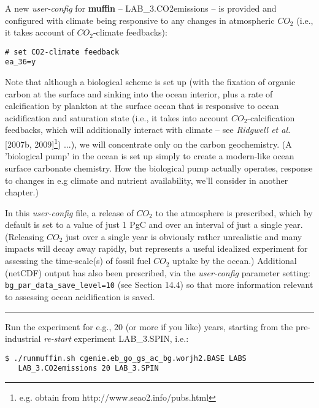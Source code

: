 \documentclass[11pt,fleqn]{book} %
\begin{document}
A new \textit{user-config} for \textbf{muffin} -- \footnotesize\textsf{LAB\_3.CO2emissions }\normalsize -- is provided and configured with climate being responsive to any changes in atmospheric \(CO_{2}\) (i.e., it takes account of \(CO_{2}\)-climate feedbacks):
\vspace{-2pt}\begin{verbatim}
# set CO2-climate feedback
ea_36=y
\end{verbatim}\vspace{-2pt}
\noindent Note that although a biological scheme is set up (with the fixation of organic carbon at the surface and sinking into the ocean interior, plus a rate of calcification by plankton at the surface ocean that is responsive to ocean acidification and saturation state (i.e., it takes into account \(CO_{2}\)-calcification feedbacks, which will additionally interact with climate – see \textit{Ridgwell et al.} [2007b, 2009]\footnote{e.g. obtain from http://www.seao2.info/pubs.html}) ...), we will concentrate only on the carbon geochemistry. (A 'biological pump' in the ocean is set up simply to create a modern-like ocean surface carbonate chemistry. How the biological pump actually operates, response to changes in e.g climate and nutrient availability, we'll consider in another chapter.)

In this \textit{user-config} file, a release of \(CO_{2}\) to the atmosphere is prescribed, which by default is set to a value of just 1 PgC and over an interval of just a single year. (Releasing \(CO_{2}\) just over a single year is obviously rather unrealistic and many impacts will decay away rapidly, but represents a useful idealized experiment for assessing the time-scale(s) of fossil fuel \(CO_{2}\) uptake by the ocean.) Additional (netCDF) output has also been prescribed, via the \textit{user-config} parameter setting: \texttt{bg\_par\_data\_save\_level=10} (see Section 14.4) so that more information relevant to assessing ocean acidification is saved.

\vspace{1mm}
\noindent\rule{4cm}{0.1mm}
\vspace{2mm}

\noindent Run the experiment for e.g., 20 (or more if you like) years, starting from the pre-industrial \textit{re-start} experiment \textsf{\footnotesize LAB\_3.SPIN}, i.e.:
\vspace{-2pt}\begin{verbatim}
$ ./runmuffin.sh cgenie.eb_go_gs_ac_bg.worjh2.BASE LABS
   LAB_3.CO2emissions 20 LAB_3.SPIN
\end{verbatim}\vspace{-2pt}
\end{document}
